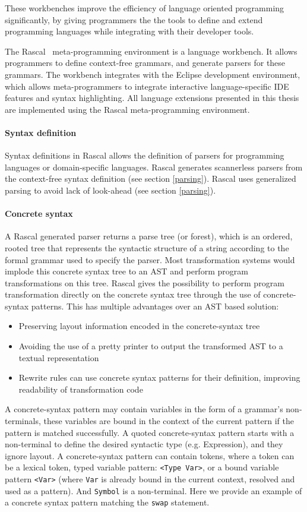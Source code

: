 These workbenches improve the efficiency of language oriented programming~\cite{Ward1994} significantly, by giving programmers the the tools to define and extend programming languages while integrating with their developer tools.

The Rascal~\cite{Klint} meta-programming environment is a language workbench. It allows programmers to define context-free grammars, and generate parsers for these grammars. The workbench integrates with the Eclipse development environment, which allows meta-programmers to integrate interactive language-specific IDE features and syntax highlighting. All language extensions presented in this thesis are implemented using the Rascal meta-programming environment.

\paragraph{Syntax definition}
Syntax definitions in Rascal allows the definition of parsers for programming languages or domain-specific languages. Rascal generates scannerless parsers from the context-free syntax definition (see section \ref{parsing}). Rascal uses generalized parsing to avoid lack of look-ahead (see section \ref{parsing}).

\paragraph{Concrete syntax}
A Rascal generated parser returns a parse tree (or forest), which is an ordered, rooted tree that represents the syntactic structure of a string according to the formal grammar used to specify the parser. Most transformation systems would implode this concrete syntax tree to an AST and perform program transformations on this tree. Rascal gives the possibility to perform program transformation directly on the concrete syntax tree through the use of concrete-syntax patterns. This has multiple advantages over an AST based solution:
\begin{itemize}
	\item Preserving layout information encoded in the concrete-syntax tree
	\item Avoiding the use of a pretty printer to output the transformed AST to a textual representation
	\item Rewrite rules can use concrete syntax patterns for their definition, improving readability of transformation code
\end{itemize}
A concrete-syntax pattern may contain variables in the form of a grammar's non-terminals, these variables are bound in the context of the current pattern if the pattern is matched successfully. A quoted concrete-syntax pattern starts with a non-terminal to define the desired syntactic type (e.g. Expression), and they ignore layout. A concrete-syntax pattern can contain tokens, where a token can be a lexical token, typed variable pattern: \lstinline$<Type Var>$, or a bound variable pattern \lstinline$<Var>$ (where \lstinline$Var$ is already bound in the current context, resolved and used as a pattern). And \lstinline$Symbol$ is a non-terminal. Here we provide an example of a concrete syntax pattern matching the \lstinline$swap$ statement.

